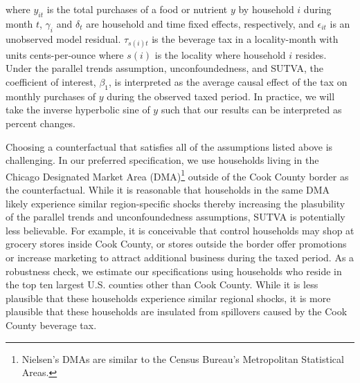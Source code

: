 \documentclass[12pt]{article}
\begin{document}
where $y_{it}$ is the total purchases of a food or nutrient $y$ by household $i$ during month $t$, $\gamma_i$ and $\delta_t$ are household and time fixed effects, respectively, and $\epsilon_{it}$ is an unobserved model residual. $\tau_{s(i)t}$ is the beverage tax in a locality-month with units cents-per-ounce where $s(i)$ is the locality where household $i$ resides. Under the parallel trends assumption, unconfoundedness, and SUTVA, the coefficient of interest, $\beta_1$, is interpreted as the average causal effect of the tax on monthly purchases of $y$ during the observed taxed period. In practice, we will take the inverse hyperbolic sine of $y$ such that our results can be interpreted as percent changes.

Choosing a counterfactual that satisfies all of the assumptions listed above is challenging. In our preferred specification, we use households living in the Chicago Designated Market Area (DMA)\footnote{Nielsen's DMAs are similar to the Census Bureau's Metropolitan Statistical Areas.} outside of the Cook County border as the counterfactual. While it is reasonable that households in the same DMA likely experience similar region-specific shocks thereby increasing the plasubility of the parallel trends and unconfoundedness assumptions, SUTVA is potentially less believable. For example, it is conceivable that control households may shop at grocery stores inside Cook County, or stores outside the border offer promotions or increase marketing to attract additional business during the taxed period. As a robustness check, we estimate our specifications using households who reside in the top ten largest U.S. counties other than Cook County. While it is less plausible that these households experience similar regional shocks, it is more plausible that these households are insulated from spillovers caused by the Cook County beverage tax.

\end{document}
